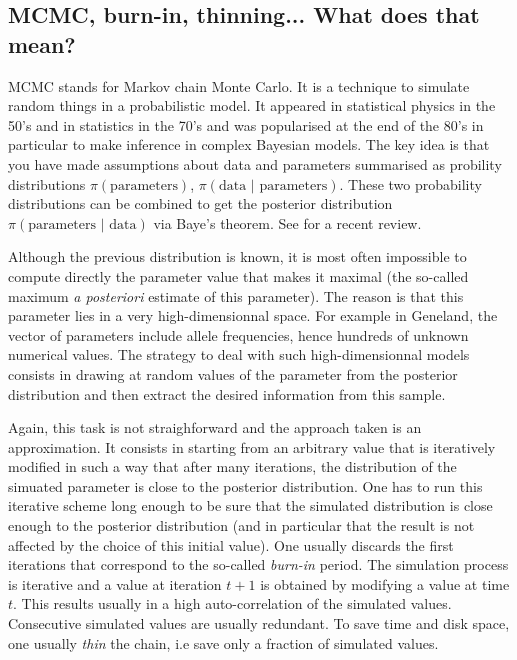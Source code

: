 \documentclass{article}
\begin{document}
\subsection[MCMC jargon]{MCMC, burn-in, thinning... What does that mean?}

MCMC stands for Markov chain Monte Carlo. It is a technique to simulate random things in a probabilistic model. 
It appeared in statistical physics 
in the 50's and in statistics in the 70's and was popularised at the end of the 80's in particular to make 
inference in complex Bayesian models. 
The key idea is that you have made assumptions about data and parameters summarised as probility distributions 
$\pi(\mbox{parameters})$,  $\pi(\mbox{data $|$ parameters})$. 
These two probability distributions can be combined to get the posterior distribution 
$\pi(\mbox{parameters $|$ data})$ via Baye's theorem. See \cite{Beaumont04} for a recent review. 


Although the previous distribution is known, it is most often impossible to compute directly the parameter value that 
makes it maximal (the so-called maximum {\em a posteriori} estimate of this parameter). The reason is that this parameter lies in a very high-dimensionnal 
space. For example in {\sc Geneland}, the vector of parameters  include allele frequencies, hence hundreds of unknown numerical values. 
The strategy to deal with such high-dimensionnal models consists in drawing at random values of the parameter from the posterior distribution 
and then extract the desired information from this sample. 

Again, this task is  not straighforward and the approach taken is an approximation. 
It consists in starting from an arbitrary value that is iteratively modified in such a way that after many iterations, 
the distribution of the 
simuated parameter is close to the posterior  distribution.  
One has to run this iterative scheme long enough to be sure that the simulated distribution is 
close enough to the posterior distribution (and in particular that the result is not  
affected by the choice of this initial value).
One usually discards the first iterations that correspond to the so-called {\em burn-in} period. 
The simulation process is iterative and a value at iteration $t+1$ is obtained by modifying a value at time $t$. This results usually in a 
high auto-correlation of the simulated values. Consecutive simulated values are usually redundant. To save time and disk space, 
one usually {\em thin} the chain, i.e save only  a fraction of simulated values. 
\end{document}

